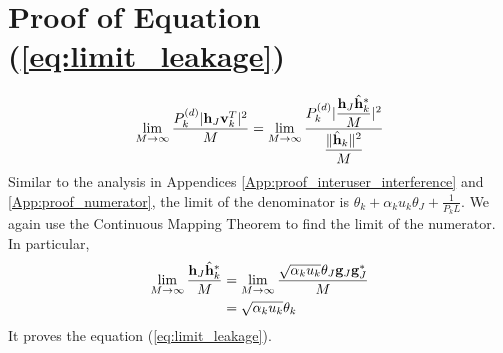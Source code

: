 \documentclass[draftclsnofoot, 12pt, onecolumn, journal]{IEEEtran}
\newcommand{\gv}{{\bf g}}
\newcommand{\hv}{{\bf h}}
\newcommand{\vv}{{\bf v}}
\begin{document}
\section{Proof of Equation (\ref{eq:limit_leakage})}
\label{App:proof_leakage} 
%
\begin{align}
\lim_{M \rightarrow \infty} \frac{ P_k^{(d)} \vert \hv_J \vv_k^T \vert^2} {M} = \lim_{M \rightarrow \infty} \frac{ P_k^{(d)} \vert \dfrac{\hv_J \hat{\hv}_k^* }{M} \vert^2} { \dfrac{\Vert \hat{\hv}_k \Vert^2}{M}}
\end{align}
%
Similar to the analysis in Appendices \ref{App:proof_interuser_interference} and \ref{App:proof_numerator}, the limit of the denominator is $\theta_k + \alpha_k u_k \theta_J + \frac{1}{P_k L}$.
We again use the Continuous Mapping Theorem to find the limit of the numerator.
In particular,
%
\begin{align}
\lim_{M \rightarrow \infty} \dfrac{ \hv_J \hat{\hv}_k^* }{M} &= 
\lim_{M \rightarrow \infty} \dfrac{ \sqrt{\alpha_k u_k} \theta_J \gv_J \gv_J^* }{M} \\
&= \sqrt{\alpha_k u_k} \theta_k
\end{align}
%
It proves the equation (\ref{eq:limit_leakage}).

 





%


\end{document}
